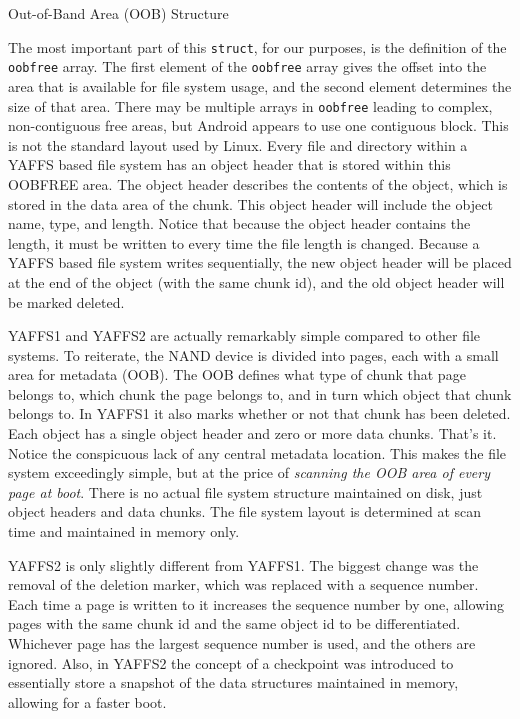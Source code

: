 \begin{table}[htb]

\caption{Out-of-Band Area (OOB) Structure}
\label{tab:oob}
\end{table}

The most important part of this \texttt{struct}, for our purposes, is the definition of the \texttt{oobfree} array.  The first element of the
\texttt{oobfree} array gives the offset into the area that is available for file system usage, and the second element determines the
size of that area.  There may be multiple arrays in \texttt{oobfree} leading to complex, non-contiguous free areas, but Android
appears to use one contiguous block.  This is not the standard layout used by Linux. Every file and directory within a YAFFS based
file system has an object header that is stored within this OOBFREE area. The object header describes the contents of the object,
which is stored in the data area of the chunk. This object header will include the object name, type, and length.  Notice that
because the object header contains the length, it must be written to every time the file length is changed.  Because a YAFFS based
file system writes sequentially, the new object header will be placed at the end of the object (with the same chunk id), and the old
object header will be marked deleted. 

YAFFS1 and YAFFS2 are actually remarkably simple compared to other file systems. To reiterate, the NAND device is divided into
pages, each with a small area for metadata (OOB).  The OOB defines what type of chunk that page belongs to, which chunk the page
belongs to, and in turn which object that chunk belongs to.  In YAFFS1 it also marks whether or not that chunk has been deleted.
Each object has a single object header and zero or more data chunks.  That's it.  Notice the conspicuous lack of any central
metadata location.  This makes the file system exceedingly simple, but at the price of \emph{scanning the OOB area of every page at
boot}.  There is no actual file system structure maintained on disk, just object headers and data chunks.  The file system layout is
determined at scan time and maintained in memory only. 

YAFFS2 is only slightly different from YAFFS1. The biggest change was the removal of the deletion marker, which was replaced with a
sequence number. Each time a page is written to it increases the sequence number by one, allowing pages with the same chunk id and
the same object id to be differentiated.  Whichever page has the largest sequence number is used, and the others are ignored.  Also,
in YAFFS2 the concept of a checkpoint was introduced to essentially store a snapshot of the data structures maintained in memory,
allowing for a faster boot.

